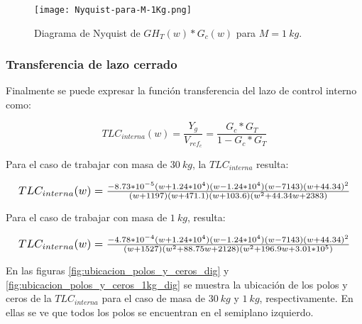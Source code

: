 \begin{figure}[H]
	\centering
	\texttt{[image: Nyquist-para-M-1Kg.png]}
	\caption{Diagrama de Nyquist de $GH_T(w)*G_c(w)$ para $M=1\:kg$.}
	\label{fig:nyquist-para-M-1Kg}
\end{figure}

\subsubsection{Transferencia de lazo cerrado}

Finalmente se puede expresar la función transferencia del lazo de control interno como:
%


\begin{equation}
	TLC_{interna}(w)=\frac{Y_g}{V_{ref_c}}=\frac{G_c*G_T}{1-G_c*G_T}
\end{equation}

Para el caso de trabajar con masa de $30\:kg$, la $TLC_{interna}$ resulta:
%

\begin{equation*}
	\resizebox{.99\hsize}{!}
	{
		$
		TLC_{interna}(w)=\frac{-8.73*10^{-5} (w+1.24*10^4) (w-1.24*10^4) (w-7143) (w+44.34)^2}{(w+1197) (w+471.1) (w+103.6) (w^2 + 44.34w + 2383)}
		$
	}
\end{equation*}


Para el caso de trabajar con masa de $1\:kg$, resulta:


\begin{equation*}
	\resizebox{.99\hsize}{!}
	{
		$
		TLC_{interna}(w)=\frac{-4.78*10^{-4} (w+1.24*10^4) (w-1.24*10^4) (w-7143) (w+44.34)^2}{(w+1527) (w^2 + 88.75w + 2128) (w^2 + 196.9w + 3.01*10^5)}	
		$
	}
\end{equation*}



En las figuras \ref{fig:ubicacion_polos_y_ceros_dig} y \ref{fig:ubicacion_polos_y_ceros_1kg_dig} se muestra la ubicación de los polos y ceros de la $TLC_{interna}$ para el caso de masa de $30\:kg$ y $1\:kg$, respectivamente. En ellas se ve que todos los polos se encuentran en el semiplano izquierdo. 


